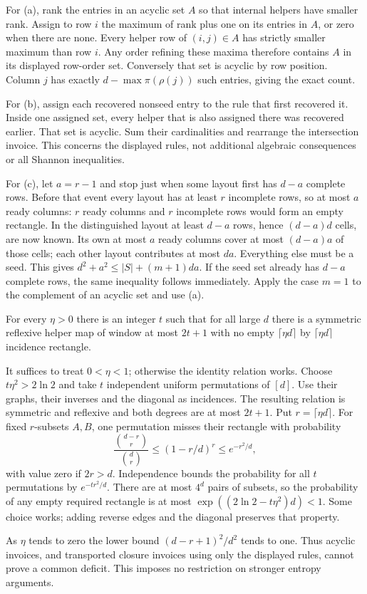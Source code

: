 \begin{outline}
For (a), rank the entries in an acyclic set $A$ so that internal helpers have smaller rank. Assign to row $i$ the
maximum of rank plus one on its entries in $A$, or zero when there are none. Every helper row of $(i,j)\in A$ has
strictly smaller maximum than row $i$. Any order refining these maxima therefore contains $A$ in its displayed
row-order set. Conversely that set is acyclic by row position. Column $j$ has exactly $d-\max\pi(\rho(j))$ such
entries, giving the exact count.

For (b), assign each recovered nonseed entry to the rule that first recovered it. Inside one assigned set, every
helper that is also assigned there was recovered earlier. That set is acyclic. Sum their cardinalities and rearrange
the intersection invoice. This concerns the displayed rules, not additional algebraic consequences or all Shannon
inequalities.

For (c), let $a=r-1$ and stop just when some layout first has $d-a$ complete rows. Before that event every layout
has at least $r$ incomplete rows, so at most $a$ ready columns: $r$ ready columns and $r$ incomplete rows would form
an empty rectangle. In the distinguished layout at least $d-a$ rows, hence $(d-a)d$ cells, are now known. Its own
at most $a$ ready columns cover at most $(d-a)a$ of those cells; each other layout contributes at most $da$.
Everything else must be a seed. This gives $d^2+a^2\le|S|+(m+1)da$. If the seed set already has $d-a$ complete
rows, the same inequality follows immediately. Apply the case $m=1$ to the complement of an acyclic set and use (a).
\end{outline}

\begin{proposition}\label{prop:mixing}
\notformalized
For every $\eta>0$ there is an integer $t$ such that for all large $d$ there is a symmetric reflexive helper map of
window at most $2t+1$ with no empty $\lceil\eta d\rceil$ by $\lceil\eta d\rceil$ incidence rectangle.
\end{proposition}
\begin{informalproof}
It suffices to treat $0<\eta<1$; otherwise the identity relation works. Choose $t\eta^2>2\ln2$ and take $t$
independent uniform permutations of $[d]$. Use their graphs, their inverses and the diagonal as incidences.
The resulting relation is symmetric and reflexive and both degrees are at most $2t+1$. Put $r=\lceil\eta d\rceil$.
For fixed $r$-subsets $A,B$, one permutation misses their rectangle with probability
\[
 \frac{\binom{d-r}{r}}{\binom dr}\le(1-r/d)^r\le e^{-r^2/d},
\]
with value zero if $2r>d$. Independence bounds the probability for all $t$ permutations by $e^{-tr^2/d}$.
There are at most $4^d$ pairs of subsets, so the probability of any empty required rectangle is at most
$\exp((2\ln2-t\eta^2)d)<1$. Some choice works; adding reverse edges and the diagonal preserves that property.
\end{informalproof}

As $\eta$ tends to zero the lower bound $(d-r+1)^2/d^2$ tends to one. Thus acyclic invoices, and transported
closure invoices using only the displayed rules, cannot prove a common deficit. This imposes no restriction on
stronger entropy arguments.
